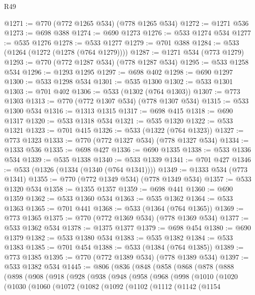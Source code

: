 \begin{lexlean}{R49}
\begin{coremodule}
@1271 := @770 (@772 @1265 @534) (@778 @1265 @534)
@1272 := @1271 @536
@1273 := @698 @388
@1274 := @690 @1273
@1276 := @533 @1274 @534
@1277 := @535 @1276
@1278 := @533 @1277
@1279 := @701 @388
@1284 := @533 (@1264 (@1272 (@1278 (@764 @1279))))
@1287 := @1271 @534 (@773 @1279)
@1293 := @770 (@772 @1287 @534) (@778 @1287 @534)
@1295 := @533 @1258 @534
@1296 := @1293 @1295
@1297 := @698 @402
@1298 := @690 @1297
@1300 := @533 @1298 @534
@1301 := @535 @1300
@1302 := @533 @1301
@1303 := @701 @402
@1306 := @533 (@1302 (@764 @1303))
@1307 := @773 @1303
@1313 := @770 (@772 @1307 @534) (@778 @1307 @534)
@1315 := @533 @1300 @534
@1316 := @1313 @1315
@1317 := @698 @415
@1318 := @690 @1317
@1320 := @533 @1318 @534
@1321 := @535 @1320
@1322 := @533 @1321
@1323 := @701 @415
@1326 := @533 (@1322 (@764 @1323))
@1327 := @773 @1323
@1333 := @770 (@772 @1327 @534) (@778 @1327 @534)
@1334 := @1333 @536
@1335 := @698 @427
@1336 := @690 @1335
@1338 := @533 @1336 @534
@1339 := @535 @1338
@1340 := @533 @1339
@1341 := @701 @427
@1346 := @533 (@1326 (@1334 (@1340 (@764 @1341))))
@1349 := @1333 @534 (@773 @1341)
@1355 := @770 (@772 @1349 @534) (@778 @1349 @534)
@1357 := @533 @1320 @534
@1358 := @1355 @1357
@1359 := @698 @441
@1360 := @690 @1359
@1362 := @533 @1360 @534
@1363 := @535 @1362
@1364 := @533 @1363
@1365 := @701 @441
@1368 := @533 (@1364 (@764 @1365))
@1369 := @773 @1365
@1375 := @770 (@772 @1369 @534) (@778 @1369 @534)
@1377 := @533 @1362 @534
@1378 := @1375 @1377
@1379 := @698 @454
@1380 := @690 @1379
@1382 := @533 @1380 @534
@1383 := @535 @1382
@1384 := @533 @1383
@1385 := @701 @454
@1388 := @533 (@1384 (@764 @1385))
@1389 := @773 @1385
@1395 := @770 (@772 @1389 @534) (@778 @1389 @534)
@1397 := @533 @1382 @534
@1445 := @806
    (@836
      (@848
        (@858
          (@868
            (@878
              (@888
                (@898
                  (@908
                    (@918
                      (@928
                        (@938
                          (@948
                            (@958
                              (@968
                                (@998
                                  (@1010
                                    (@1020
                                      (@1030
                                        (@1060
                                          (@1072
                                            (@1082
                                              (@1092
                                                (@1102
                                                  (@1112
                                                    (@1142
                                                      (@1154

\end{coremodule}
\end{lexlean}
